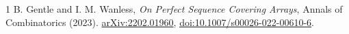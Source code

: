 \documentclass[11pt]{article}
\begin{document}
\begin{thebibliography}{1}
 B. Gentle and I. M. Wanless,
\emph{On Perfect Sequence Covering Arrays},
Annals of Combinatorics (2023).
\href{https://arxiv.org/abs/2202.01960}{arXiv:2202.01960},
\href{https://doi.org/10.1007/s00026-022-00610-6}{doi:10.1007/s00026-022-00610-6}.
\end{thebibliography}
\end{document}

